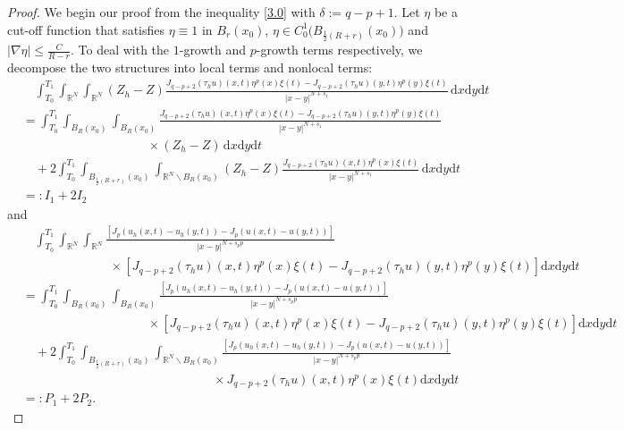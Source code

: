 \documentclass[reqno,10pt]{amsart}
\numberwithin{equation}{section}
\begin{document}
\begin{proof}
	We begin our proof from the inequality \eqref{3.0} with $\delta:=q-p+1$. Let $\eta$ be a cut-off function that satisfies $\eta\equiv1$ in $B_r(x_0)$, $\eta\in C^1_0\bigl(B_{\frac{1}{2}(R+r)}(x_0)\bigl)$ and $|\nabla\eta|\le \frac{C}{R-r}$. To deal with the $1$-growth and $p$-growth terms respectively, we decompose the two structures into local terms and nonlocal terms:
	\begin{align*}
		&\quad\int_{T_0}^{T_1}\int_{\mathbb{R}^N}\int_{\mathbb{R}^N}(Z_h-Z)\frac{J_{q-p+2}(\tau_hu)(x,t)\eta^p(x)\xi(t)-J_{q-p+2}(\tau_hu)(y,t)\eta^p(y)\xi(t)}{|x-y|^{N+s_1}}\,\mathrm{d}x\mathrm{d}y\mathrm{d}t\\
		&=\int_{T_0}^{T_1}\int_{B_R(x_0)}\int_{B_R(x_0)}\frac{J_{q-p+2}(\tau_hu)(x,t)\eta^p(x)\xi(t)-J_{q-p+2}(\tau_hu)(y,t)\eta^p(y)\xi(t)}{|x-y|^{N+s_1}}\nonumber\\
		&\qquad\qquad\qquad\qquad\qquad\times(Z_h-Z)\,\mathrm{d}x\mathrm{d}y\mathrm{d}t\\
		&\quad+2\int_{T_0}^{T_1}\int_{B_{\frac{1}{2}(R+r)}(x_0)}\int_{\mathbb{R}^N\backslash B_{R}(x_0)}(Z_h-Z)\frac{J_{q-p+2}(\tau_hu)(x,t)\eta^p(x)\xi(t)}{|x-y|^{N+s_1}}\,\mathrm{d}x\mathrm{d}y\mathrm{d}t\\
		&=:I_1+2I_2
	\end{align*}
	and
	\begin{align}
		\label{4.01}
		&\quad\int_{T_0}^{T_1}\int_{\mathbb{R}^N}\int_{\mathbb{R}^N}\frac{\left[ J_{p}\left(u_h(x,t)-u_h(y,t)\right)-J_{p}\left(u(x,t)-u(y,t)\right)\right] }{|x-y|^{N+s_pp}}\nonumber\\
		&\qquad\qquad\qquad\quad\times\left[ J_{q-p+2}(\tau_hu)(x,t)\eta^p(x)\xi(t)-J_{q-p+2}(\tau_hu)(y,t)\eta^p(y)\xi(t)\right]\mathrm{d}x\mathrm{d}y\mathrm{d}t\nonumber\\
		&=\int_{T_0}^{T_1}\int_{B_R(x_0)}\int_{B_R(x_0)}\frac{\left[ J_{p}\left(u_h(x,t)-u_h(y,t)\right)-J_{p}\left(u(x,t)-u(y,t)\right)\right] }{|x-y|^{N+s_pp}}\nonumber\\
		&\qquad\qquad\qquad\qquad\qquad\times\left[ J_{q-p+2}(\tau_hu)(x,t)\eta^p(x)\xi(t)-J_{q-p+2}(\tau_hu)(y,t)\eta^p(y)\xi(t)\right]\mathrm{d}x\mathrm{d}y\mathrm{d}t\nonumber\\
		&\quad+2\int_{T_0}^{T_1}\int_{B_{\frac{1}{2}(R+r)}(x_0)}\int_{\mathbb{R}^N\backslash B_{R}(x_0)}\frac{\left[ J_{p}\left(u_h(x,t)-u_h(y,t)\right)-J_{p}\left(u(x,t)-u(y,t)\right)\right] }{|x-y|^{N+s_pp}}\nonumber\\
		&\qquad\qquad\qquad\qquad\qquad\qquad\qquad\quad\ \times J_{q-p+2}(\tau_hu)(x,t)\eta^p(x)\xi(t)\mathrm{d}x\mathrm{d}y\mathrm{d}t\nonumber\\
		&=:P_1+2P_2.
	\end{align}
	

\end{proof}
\end{document}
